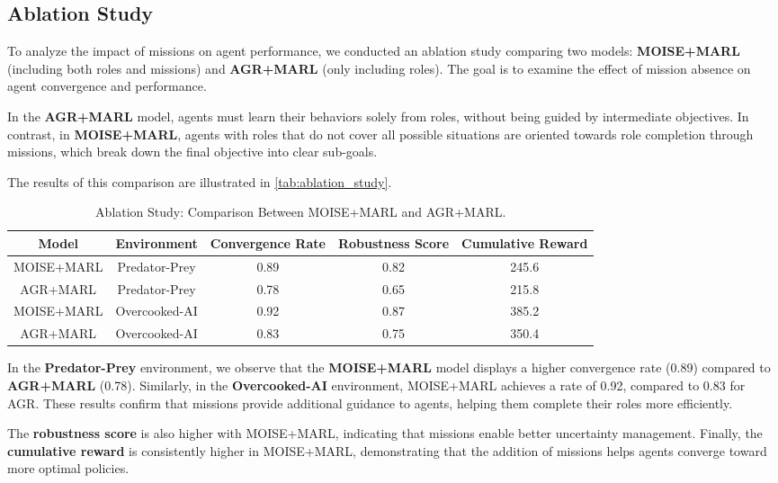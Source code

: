 \documentclass[sigconf,anonymous]{aamas}
\begin{document}
\subsection{Ablation Study}

To analyze the impact of missions on agent performance, we conducted an ablation study comparing two models: \textbf{MOISE+MARL} (including both roles and missions) and \textbf{AGR+MARL} (only including roles). The goal is to examine the effect of mission absence on agent convergence and performance.

In the \textbf{AGR+MARL} model, agents must learn their behaviors solely from roles, without being guided by intermediate objectives. In contrast, in \textbf{MOISE+MARL}, agents with roles that do not cover all possible situations are oriented towards role completion through missions, which break down the final objective into clear sub-goals.

The results of this comparison are illustrated in \autoref{tab:ablation_study}.

\begin{table*}[h!]
    \centering
    \caption{Ablation Study: Comparison Between MOISE+MARL and AGR+MARL.}
    \label{tab:ablation_study}
    \begin{tabular}{|c|c|c|c|c|}
        \hline
        \textbf{Model} & \textbf{Environment} & \textbf{Convergence Rate} & \textbf{Robustness Score} & \textbf{Cumulative Reward} \\ \hline
        MOISE+MARL & Predator-Prey & 0.89 & 0.82 & 245.6 \\ \hline
        AGR+MARL & Predator-Prey & 0.78 & 0.65 & 215.8 \\ \hline
        MOISE+MARL & Overcooked-AI & 0.92 & 0.87 & 385.2 \\ \hline
        AGR+MARL & Overcooked-AI & 0.83 & 0.75 & 350.4 \\ \hline
    \end{tabular}
\end{table*}

In the \textbf{Predator-Prey} environment, we observe that the \textbf{MOISE+MARL} model displays a higher convergence rate (0.89) compared to \textbf{AGR+MARL} (0.78). Similarly, in the \textbf{Overcooked-AI} environment, MOISE+MARL achieves a rate of 0.92, compared to 0.83 for AGR. These results confirm that missions provide additional guidance to agents, helping them complete their roles more efficiently.

The \textbf{robustness score} is also higher with MOISE+MARL, indicating that missions enable better uncertainty management. Finally, the \textbf{cumulative reward} is consistently higher in MOISE+MARL, demonstrating that the addition of missions helps agents converge toward more optimal policies.
\end{document}
